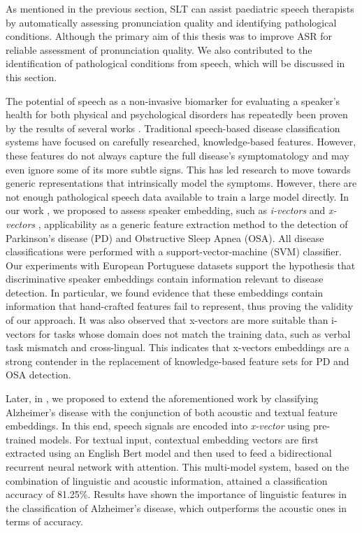 \label{chap:final}
\cleardoublepage

As mentioned in the previous section, SLT can assist paediatric speech therapists by automatically assessing pronunciation quality and identifying pathological conditions. Although the primary aim of this thesis was to improve ASR for reliable assessment of pronunciation quality. We also contributed to the identification of pathological conditions from speech, which will be discussed in this section. 

The potential of speech as a non-invasive biomarker for evaluating a speaker's health for both physical and psychological disorders has repeatedly been proven by the results of several works  \cite{hauptman2019identifying,botelho2019speech}. Traditional speech-based disease classification systems have focused on carefully researched, knowledge-based features. However, these features do not always capture the full disease's symptomatology and may even ignore some of its more subtle signs. This has led research to move towards generic representations that intrinsically model the symptoms. However, there are not enough pathological speech data available to train a large model directly. In our work \cite{botelho2020pathological}, we proposed to assess speaker embedding, such as \textit{i-vectors} \cite{ivector} and \textit{x-vectors} \cite{snyder2018x}, applicability as a generic feature extraction method to the detection of Parkinson’s disease (PD) and Obstructive Sleep Apnea (OSA). All disease classifications were performed with a support-vector-machine (SVM) classifier. Our experiments with European Portuguese datasets support the hypothesis that discriminative speaker embeddings contain information relevant to disease detection. In particular, we found evidence that these embeddings contain information that hand-crafted features fail to represent, thus proving the validity of our approach. It was also observed that x-vectors are more suitable than i-vectors for tasks whose domain does not match the training data, such as verbal task mismatch and cross-lingual. This indicates that x-vectors embeddings are a strong contender in the replacement of knowledge-based feature sets for PD and OSA detection.

Later, in \cite{pompili2020inesc}, we proposed to extend the aforementioned work by classifying Alzheimer's disease with the conjunction of both acoustic and textual feature embeddings. In this end, speech signals are encoded into \textit{x-vector} using pre-trained models. For textual input, contextual embedding vectors are first extracted using an English Bert model \cite{Bert} and then used to feed a bidirectional recurrent neural network with attention. This multi-model system, based on the combination of linguistic and acoustic information, attained a classification accuracy of 81.25\%. Results have shown the importance of linguistic features in the classification of Alzheimer’s disease, which outperforms the acoustic ones in terms of accuracy.


